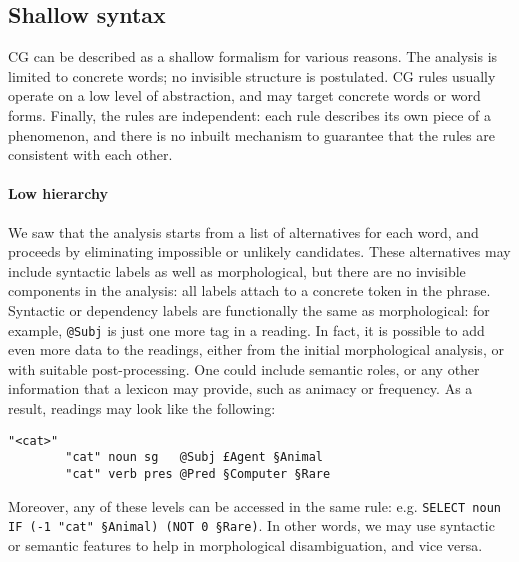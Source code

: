 

\subsection{Shallow syntax}\label{shallow-syntax}

CG can be described as a shallow formalism for various reasons. 
The analysis is limited to concrete words; no invisible structure is postulated.
CG rules usually operate on a low level of abstraction, and may target concrete words or word forms.
Finally, the rules are independent: each rule describes its own piece of a phenomenon, and there is no inbuilt mechanism to guarantee that the rules are consistent with each other.



\paragraph{Low hierarchy}


We saw that the analysis starts from a list of alternatives for each word, and proceeds by eliminating impossible or unlikely candidates.
These alternatives may include syntactic labels as well as morphological, but there are no invisible components in the analysis: all labels attach to a concrete token in the phrase.
Syntactic or dependency labels are functionally the same as morphological: for example, \texttt{@Subj} is just one more tag in a reading.
In fact, it is possible to add even more data to the readings, either from the initial morphological analysis, or with suitable post-processing. One could include semantic roles, or any other information that a lexicon may provide, such as animacy or frequency.
As a result, readings may look like the following:

\begin{verbatim}
"<cat>"
        "cat" noun sg   @Subj £Agent §Animal
        "cat" verb pres @Pred §Computer §Rare
\end{verbatim}

\noindent Moreover, any of these levels can be accessed in the same rule: e.g. \texttt{SELECT noun IF (-1 "cat" §Animal) (NOT 0 §Rare)}. 
In other words, we may use syntactic or semantic features to help in morphological disambiguation, and vice versa.

